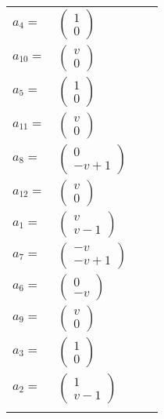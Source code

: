 \documentclass[1p]{elsarticle_modified}
\theoremstyle{definition}
\begin{document}
\begin{tabular}{m{7pt} m{180pt} m{7pt} m{180pt} }
\flushright $a_{4}=$&$\begin{pmatrix}1\\0\end{pmatrix}$ \\
\flushright $a_{10}=$&$\begin{pmatrix}v\\0\end{pmatrix}$ \\
\flushright $a_{5}=$&$\begin{pmatrix}1\\0\end{pmatrix}$ \\
\flushright $a_{11}=$&$\begin{pmatrix}v\\0\end{pmatrix}$ \\
\flushright $a_{8}=$&$\begin{pmatrix}0\\- v+1\end{pmatrix}$ \\
\flushright $a_{12}=$&$\begin{pmatrix}v\\0\end{pmatrix}$ \\
\flushright $a_{1}=$&$\begin{pmatrix}v\\v-1\end{pmatrix}$ \\
\flushright $a_{7}=$&$\begin{pmatrix}- v\\- v+1\end{pmatrix}$ \\
\flushright $a_{6}=$&$\begin{pmatrix}0\\- v\end{pmatrix}$ \\
\flushright $a_{9}=$&$\begin{pmatrix}v\\0\end{pmatrix}$ \\
\flushright $a_{3}=$&$\begin{pmatrix}1\\0\end{pmatrix}$ \\
\flushright $a_{2}=$&$\begin{pmatrix}1\\v-1\end{pmatrix}$\\&\end{tabular}
\end{document}
